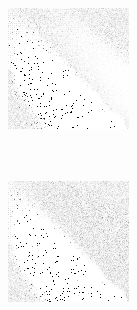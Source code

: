 \begin{figure}
	\begin{subfigure}[t]{0.22\textwidth}
		\includegraphics[width=\textwidth]{images/findings/experiments/punishment/strategies_cribminavg.png}
		\caption{\cribminavg}
	\end{subfigure}
	~
	\begin{subfigure}[t]{0.22\textwidth}
		\includegraphics[width=\textwidth]{images/findings/experiments/punishment/strategies_peggingmaxavggained.png}

\end{subfigure}
\end{figure}
